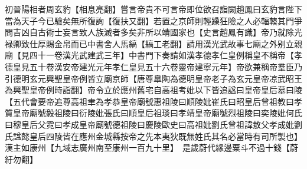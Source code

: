 初晉陽相者周玄豹【相息亮翻】嘗言帝貴不可言帝即位欲召詣闕趙鳳曰玄豹言陛下當為天子今已驗矣無所復詢【復扶又翻】若置之京師則輕躁狂險之人必輻輳其門爭問吉凶自古術士妄言致人族滅者多矣非所以靖國家也【史言趙鳳有識】帝乃就除光禄卿致仕厚賜金帛而已中書舍人馬縞【縞工老翻】請用漢光武故事七廟之外别立親廟【見四十一卷漢光武建武三年】中書門下奏請如漢孝德孝仁皇例稱皇不稱帝【孝德皇見五十卷漢安帝建光元年孝仁皇見五十六卷靈帝建寧元年】帝欲兼稱帝羣臣乃引德明玄元興聖皇帝例皆立廟京師【唐尊臯陶為德明皇帝老子為玄元皇帝凉武昭王為興聖皇帝例時詣翻】帝令立於應州舊宅自高祖考妣以下皆追諡曰皇帝皇后墓曰陵【五代會要帝追尊高祖聿為孝恭皇帝廟號惠祖陵曰順陵妣崔氏曰昭皇后曾祖教曰孝質皇帝廟號毅祖陵曰衍陵妣張氏曰順皇后祖琰曰孝靖皇帝廟號烈祖陵曰奕陵妣何氏曰穆皇后父霓曰孝成皇帝廟號德祖陵曰慶陵歐史曰高祖妣劉氏曾祖諱敖父孝成妣劉氏諡懿皇后四陵皆在應州金城縣按帝之先本夷狄既無姓氏其名必當時有司所製也】　漢主如康州【九域志廣州南至康州一百九十里】　是歲蔚代緣邊粟斗不過十錢【蔚紆勿翻】

